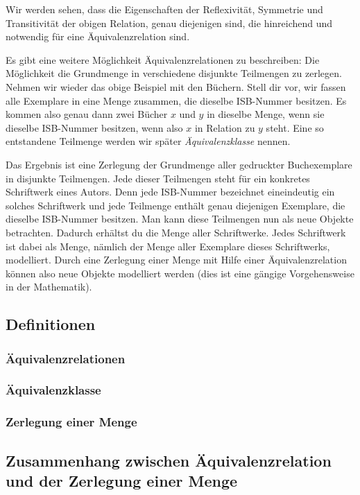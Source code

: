 Wir werden sehen, dass die Eigenschaften der Reflexivität, Symmetrie und Transitivität der obigen Relation, genau diejenigen sind, die hinreichend und notwendig für eine Äquivalenzrelation sind.

Es gibt eine weitere Möglichkeit Äquivalenzrelationen zu beschreiben: Die Möglichkeit die Grundmenge in verschiedene disjunkte Teilmengen zu zerlegen. Nehmen wir wieder das obige Beispiel mit den Büchern. Stell dir vor, wir fassen alle Exemplare in eine Menge zusammen, die dieselbe ISB-Nummer besitzen. Es kommen also genau dann zwei Bücher $x$ und $y$ in dieselbe Menge, wenn sie dieselbe ISB-Nummer besitzen, wenn also $x$ in Relation zu $y$ steht. Eine so entstandene Teilmenge werden wir später \textit{Äquivalenzklasse} nennen.

Das Ergebnis ist eine Zerlegung der Grundmenge aller gedruckter Buchexemplare in disjunkte Teilmengen. Jede dieser Teilmengen steht für ein konkretes Schriftwerk eines Autors. Denn jede ISB-Nummer bezeichnet eineindeutig ein solches Schriftwerk und jede Teilmenge enthält genau diejenigen Exemplare, die dieselbe ISB-Nummer besitzen. Man kann diese Teilmengen nun als neue Objekte betrachten. Dadurch erhältst du die Menge aller Schriftwerke. Jedes Schriftwerk ist dabei als Menge, nämlich der Menge aller Exemplare dieses Schriftwerks, modelliert. Durch eine Zerlegung einer Menge mit Hilfe einer Äquivalenzrelation können also neue Objekte modelliert werden (dies ist eine gängige Vorgehensweise in der Mathematik).



\subsection{Definitionen}

\subsubsection{Äquivalenzrelationen}
\subsubsection{Äquivalenzklasse}
\subsubsection{Zerlegung einer Menge}
\subsection{Zusammenhang zwischen Äquivalenzrelation und der Zerlegung einer Menge}
